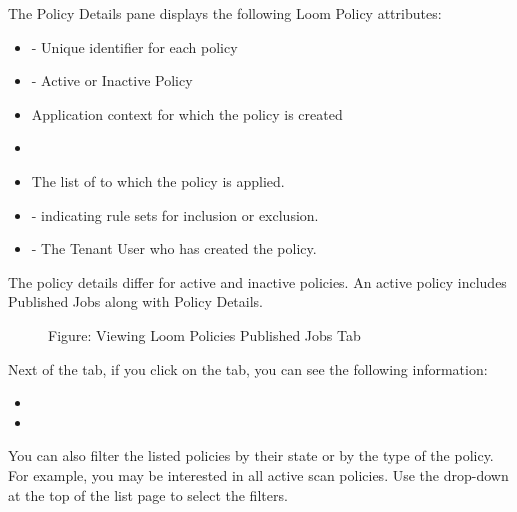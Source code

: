 \documentclass[letterpaper,10pt,english]{sphinxmanual}
\begin{document}
The Policy Details pane displays the following Loom Policy attributes:
\begin{itemize}
\item {} 
 - Unique identifier for each policy

\item {} 
 - Active or Inactive Policy

\item {} 
Application context for which the policy is created

\item {} 

\item {} 
The list of  to which the policy is applied.

\item {} 
 - indicating rule sets for inclusion or exclusion.

\item {} 
 - The Tenant User who has created the policy.

\end{itemize}

The policy details differ for active and inactive policies. An active policy includes Published Jobs along with Policy Details.

\begin{figure}[htbp]
\centering
\capstart

\noindent{}
\caption{Figure: Viewing Loom Policies Published Jobs Tab}\label{\detokenize{loom_getting_started_guide:id44}}\end{figure}

Next of the  tab, if you click on the  tab, you can see the following information:
\begin{itemize}
\item {} 

\item {} 

\end{itemize}

You can also filter the listed policies by their state or by the type of the policy. For example, you may be interested in all active scan policies. Use the drop-down at the top of the list page to select the filters.
\end{document}
